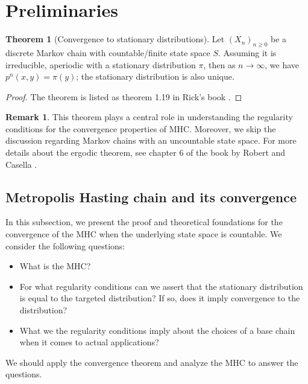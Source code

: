 \documentclass[]{article}
\theoremstyle{definition}
\newtheorem{theorem}{Theorem}       %
\newtheorem{remark}{Remark}[subsection]
{
    \newtheorem{assumption}{Assumption}
}
\begin{document}
\section{Preliminaries}\label{sec:preliminaries}
    \begin{theorem}[Convergence to stationary distributions]\label{thm:cvg_sta_distr}
        Let $(X_n)_{n\ge 0}$ be a discrete Markov chain with countable/finite state space $S$. Assuming it is irreducible, aperiodic with a stationary distribution $\pi$, then as $n\rightarrow \infty$, we have $p^n(x, y) = \pi(y)$; the stationary distribution is also unique. 
    \end{theorem}
    \begin{proof}
        The theorem is listed as theorem 1.19 in Rick's book \cite{book:rick_essential}. 
    \end{proof}
    \begin{remark}
        This theorem plays a central role in understanding the regularity conditions for the convergence properties of MHC. Moreover, we skip the discussion regarding Markov chains with an uncountable state space. For more details about the ergodic theorem, see chapter 6 of the book by Robert and Casella \cite{book:robert_casella_2005}. 
    \end{remark}
    \subsection{Metropolis Hasting chain and its convergence}
        In this subsection, we present the proof and theoretical foundations for the convergence of the MHC when the underlying state space is countable. We consider the following questions: 
        \begin{itemize}
            \item [1.] What is the MHC? 
            \item [2.] For what regularity conditions can we assert that the stationary distribution is equal to the targeted distribution? If so, does it imply convergence to the distribution?
            \item [3.] What we the regularity conditions imply about the choices of a base chain when it comes to actual applications? 
        \end{itemize}
        We should apply the convergence theorem and analyze the MHC to answer the questions. 
\end{document}
